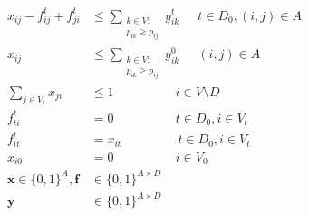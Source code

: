 \begin{subequations}
\begin{flalign}
\label{con:pf1:yvar} x_{ij} -f^t_{ij}+f^t_{ji}  &\leq \sum\limits_{\substack{k\in V: \\ p_{ik}\geq p_{ij}}}y^t_{ik}   ~~\quad  t\in D_0, (i,j)\in A \\  		
\label{con:pf1:yvar0} x_{ij} &\leq \sum\limits_{\substack{k\in V: \\ p_{ik}\geq p_{ij}}}y^0_{ik}   ~~\quad  (i,j)\in A \\  		
\label{con:pf1:B}  \sum_{j\in V_i}x_{ji}&\leq 1~~~~ \qquad  \qquad i\in V\setminus D\\
\label{con:pf1:noflowFromT} f_{ti}^t&=0 ~~~~ \qquad  \qquad t\in D_0, i\in V_t   \\
\label{con:pf1:fitt=xit} f_{it}^t&=x_{it} ~~ \qquad  \qquad t\in D_0, i\in V_t \\
\label{con:pf1:xi0=0} x_{i0}&=0 ~~~~ \qquad  \qquad i\in V_0 \\
\label{con:pf1:dim}	\mathbf{x} \in \{0,1\}^{A},\mathbf{f}&\in\{0,1\}^{A \times D} \\ 
\label{con:pf1:dimy} \mathbf{y}&\in \{0,1\}^{A\times D}
    \end{flalign}~
    \end{subequations}
    
